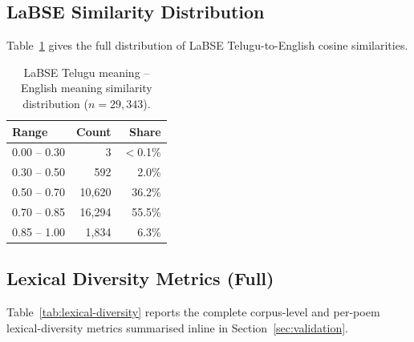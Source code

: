 \documentclass[11pt]{article}
\begin{document}
\subsection{LaBSE Similarity Distribution}

Table~\ref{tab:labse_dist} gives the full distribution of LaBSE
Telugu-to-English cosine similarities.

\begin{table}[H]
\centering
\small
\caption{LaBSE Telugu meaning -- English meaning similarity
distribution ($n = 29{,}343$).}
\label{tab:labse_dist}
\begin{tabular}{lrr}
\toprule
\textbf{Range} & \textbf{Count} & \textbf{Share} \\
\midrule
0.00 -- 0.30 &      3 & $<$0.1\% \\
0.30 -- 0.50 &    592 &    2.0\% \\
0.50 -- 0.70 & 10,620 &   36.2\% \\
0.70 -- 0.85 & 16,294 &   55.5\% \\
0.85 -- 1.00 &  1,834 &    6.3\% \\
\bottomrule
\end{tabular}
\end{table}

\subsection{Lexical Diversity Metrics (Full)}

Table~\ref{tab:lexical-diversity} reports the complete corpus-level
and per-poem lexical-diversity metrics summarised inline in
Section~\ref{sec:validation}.
\end{document}
